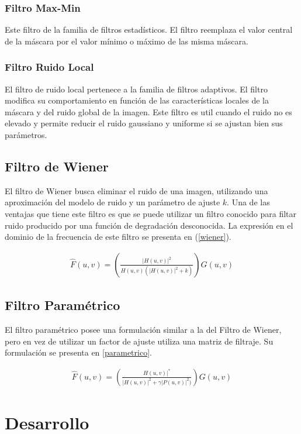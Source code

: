 \documentclass[
  letterpaper,
  twocolumn,
  9pt,
  journal,
  final]{IEEEtran}
\begin{document}
\subsubsection{Filtro Max-Min}
Este filtro de la familia de filtros estadísticos. El filtro reemplaza el valor central de la máscara por el valor mínimo o máximo de las misma máscara.

\subsubsection{Filtro Ruido Local}
El filtro de ruido local pertenece a la familia de filtros adaptivos. El filtro modifica su comportamiento en función de las características locales de la máscara y del ruido global de la imagen. Este filtro es util cuando el ruido no es elevado y permite reducir el ruido gaussiano y uniforme si se ajustan bien sus parámetros.

\subsection{Filtro de Wiener}
El filtro de Wiener busca eliminar el ruido de una imagen, utilizando una aproximación del modelo de ruido y un parámetro de ajuste $k$. Una de las ventajas que tiene este filtro es que se puede utilizar un filtro conocido para filtar ruido producido por una función de degradación desconocida. La expresión en el dominio de la frecuencia de este filtro se presenta en (\ref{wiener}).

\begin{align}
  \hat{F}(u,v) = \left( \frac{| H(u,v)|^2 }{ H(u,v) (|H(u,v)|^2 +k)  }    \right ) G(u,v) \label{wiener}
\end{align}

\subsection{Filtro Paramétrico}
El filtro paramétrico posee una formulación similar a la del Filtro de Wiener, pero en vez de utilizar un factor de ajuste utiliza una matriz de filtraje. Su formulación se presenta en \ref{parametrico}.

\begin{align}
  \hat{F}(u,v) = \left( \frac{H(u,v)|^* }{ |H(u,v)|^2 + \gamma |P(u,v)|^2)} \right ) G(u,v) \label{parametrico}
\end{align}

\section{Desarrollo}
\end{document}
